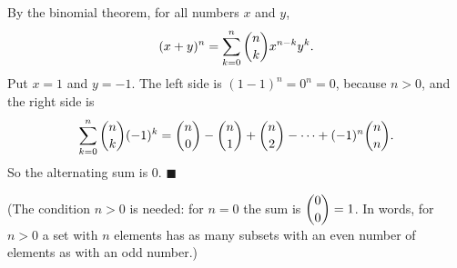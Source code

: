 By the binomial theorem, for all numbers $x$ and $y$,
\[(x+y)^n=\sum_{k=0}^{n}\dbinom nk x^{n-k}y^k.\]
Put $x=1$ and $y=-1$. The left side is $(1-1)^n=0^n=0$, because $n>0$, and the right side is
\[\sum_{k=0}^{n}\dbinom nk(-1)^k=\dbinom n0-\dbinom n1+\dbinom n2-\cdots+(-1)^n\dbinom nn.\]
So the alternating sum is $0$. $\blacksquare$

(The condition $n>0$ is needed: for $n=0$ the sum is $\dbinom00=1$. In words, for $n>0$ a set with $n$ elements has as many subsets with an even number of elements as with an odd number.)
